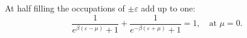 \documentclass{article}
\begin{document}
At half filling the occupations of $\pm\varepsilon$ add up to one:
\begin{equation}
\frac{1}{e^{\beta(\varepsilon-\mu)}+1} + \frac{1}{e^{-\beta(\varepsilon+\mu)}+1} = 1, \quad \text{at } \mu = 0 .
\label{eq:ph}
\end{equation}
\end{document}
